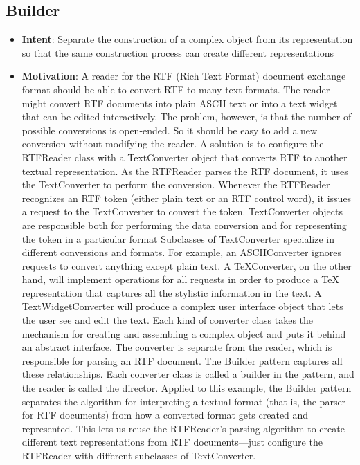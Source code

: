 \documentclass{report}
\begin{document}
        \subsection{Builder}
        \begin{itemize}
            \item \textbf{Intent}: Separate the construction of a complex object from its representation so that the same construction process can create different representations
            \item \textbf{Motivation}:  A reader for the RTF (Rich Text Format) document exchange format should be able to convert RTF to many text formats. The reader might convert RTF documents into plain ASCII text or into a text widget that can be edited interactively. The problem, however, is that the number of possible conversions is open-ended. So it should be easy to add a new conversion without modifying the reader.
                \bigbreak \noindent 
                A solution is to configure the RTFReader class with a TextConverter object that converts RTF to another textual representation. As the RTFReader parses the RTF document, it uses the TextConverter to perform the conversion. Whenever the RTFReader recognizes an RTF token (either plain text or an RTF control word), it issues a request to the TextConverter to convert the token. TextConverter objects are responsible both for performing the data conversion and for representing the token in a particular format
                \bigbreak \noindent 
                Subclasses of TextConverter specialize in different conversions and formats. For example, an ASCIIConverter ignores requests to convert anything except plain text. A TeXConverter, on the other hand, will implement operations for all requests in order to produce a TeX representation that captures all the stylistic information in the text. A TextWidgetConverter will produce a complex user interface object that lets the user see and edit the text.
                \bigbreak \noindent 
                \bigbreak \noindent 
                Each kind of converter class takes the mechanism for creating and assembling a complex object and puts it behind an abstract interface. The converter is separate from the reader, which is responsible for parsing an RTF document.
                \bigbreak \noindent 
                The Builder pattern captures all these relationships. Each converter class is called a builder in the pattern, and the reader is called the director. Applied to this example, the Builder pattern separates the algorithm for interpreting a textual format (that is, the parser for RTF documents) from how a converted format gets created and represented. This lets us reuse the RTFReader's parsing algorithm to create different text representations from RTF documents—just configure the RTFReader with different subclasses of TextConverter.

\end{itemize}
\end{document}
